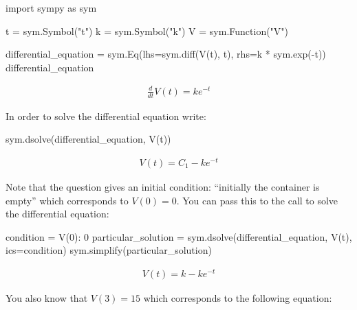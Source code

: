 \begin{pyin}
import sympy as sym

t = sym.Symbol("t")
k = sym.Symbol("k")
V = sym.Function("V")

differential_equation = sym.Eq(lhs=sym.diff(V(t), t), rhs=k * sym.exp(-t))
differential_equation
\end{pyin}




\begin{equation*}
\begin{split}\displaystyle \frac{d}{d t} V{\left(t \right)} = k e^{- t}\end{split}
\end{equation*}




In order to solve the differential equation write:




\begin{pyin}
sym.dsolve(differential_equation, V(t))
\end{pyin}




\begin{equation*}
\begin{split}\displaystyle V{\left(t \right)} = C_{1} - k e^{- t}\end{split}
\end{equation*}




Note that the question gives an initial condition: ``initially the container
is empty'' which corresponds to \(V(0)=0\).
You can pass this to the call to solve the differential equation:




\begin{pyin}
condition = {V(0): 0}
particular_solution = sym.dsolve(differential_equation, V(t), ics=condition)
sym.simplify(particular_solution)
\end{pyin}




\begin{equation*}
\begin{split}\displaystyle V{\left(t \right)} = k - k e^{- t}\end{split}
\end{equation*}




You also know that \(V(3)=15\) which corresponds to the following equation:





